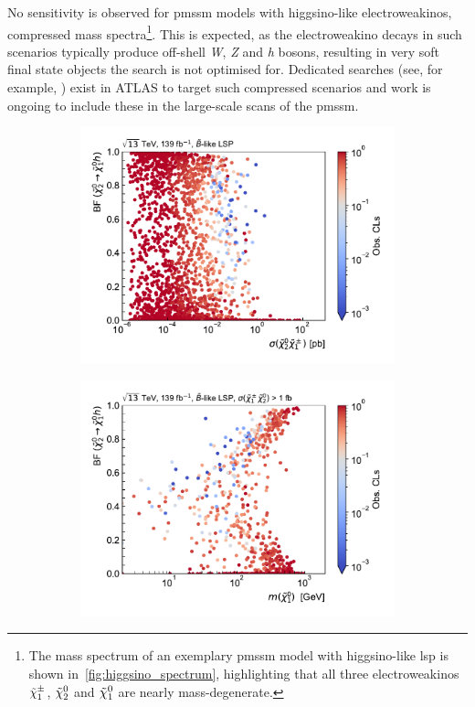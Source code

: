 No sensitivity is observed for \gls{pmssm} models with higgsino-like electroweakinos, \ie compressed mass spectra\footnote{The mass spectrum of an exemplary \gls{pmssm} model with higgsino-like \gls{lsp} is shown in~\cref{fig:higgsino_spectrum}, highlighting that all three electroweakinos $\tilde{\chi}_1^\pm$, $\tilde{\chi}_2^0$ and $\tilde{\chi}_1^0$ are nearly mass-degenerate.}. This is expected, as the electroweakino decays in such scenarios typically produce off-shell \textit{W}, \textit{Z} and \textit{h} bosons, resulting in very soft final state objects the \onelepton search is not optimised for. Dedicated searches (see, for example, \cite{SUSY-2018-16}) exist in ATLAS to target such compressed scenarios and work is ongoing to include these in the large-scale scans of the \gls{pmssm}.

 \begin{figure}
	\centering
	\begin{subfigure}[b]{0.5\linewidth}
		\centering\includegraphics[width=\textwidth]{scatter/fig_scatter_xsec_BFHiggs_bino}
		\vspace{-2em}
		\caption{\label{fig:fig_scatter_xsec_BFHiggs_bino}}
	\end{subfigure}\hfill
	\begin{subfigure}[b]{0.5\linewidth}
		\centering\includegraphics[width=\textwidth]{scatter/fig_scatter_mchi10_BFHiggs_bino_withXsecCut}

\end{subfigure}
\end{figure}
